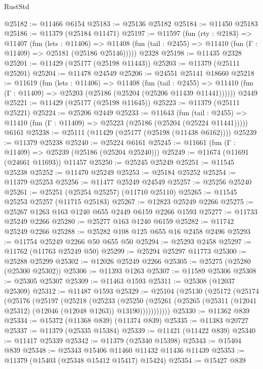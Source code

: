 \begin{lexlean}{RustStd}
\begin{coremodule}
@25182 := @11466 @6154
@25183 := @25136 @25182
@25184 := @11450 @25183
@25186 := @11379 (@25184 @11471)
@25197 := @11597
    (fun (rty : @2183) =>
    @11407
      (fun (lets : @11406) =>
      @11408 (fun (tail : @2455) => @11410 (fun (Γ : @11409) => @25181 (@25186 @25146)))))
    @2328
@25198 := @11435 @2328
@25201 := @11429 (@25177 (@25198 @11443))
@25203 := @11379 (@25111 @25201)
@25204 := @11478 @24549
@25206 := @24551 @25141 @18660
@25218 := @11619
    (fun (lets : @11406) =>
    @11408
      (fun (tail : @2455) =>
      @11410 (fun (Γ : @11409) => @25203 (@25186 (@25204 (@25206 @11439 @11441))))))
    @2449
@25221 := @11429 (@25177 (@25198 @11645))
@25223 := @11379 (@25111 @25221)
@25224 := @25206 @2449
@25233 := @11643
    (fun (tail : @2455) => @11410 (fun (Γ : @11409) => @25223 (@25186 (@25204 (@25224 @11441)))))
    @6161
@25238 := @25111 (@11429 (@25177 (@25198 (@11438 @6162))))
@25239 := @11379 @25238
@25240 := @25224 @6161
@25245 := @11661 (fun (Γ : @11409) => @25239 (@25186 (@25204 @25240)))
@25249 := @11674 (@11691 (@24661 @11693)) @11457
@25250 := @25245 @25249
@25251 := @11545 @25238
@25252 := @11470 @25249
@25253 := @25184 @25252
@25254 := @11379 @25253
@25256 := @11477 @25249 @24549
@25257 := @25256 @25240
@25261 := @25251 (@25254 @25257) (@11710 @25110)
@25265 := @11545 @25253 @25257 (@11715 @25183)
@25267 := @12823 @25249 @2266
@25275 := @25267 @1263 @163 @1240 @655 @2449 @6159 @2266 @1593
@25277 := @11733 @25249 @2266
@25280 := @25277 @163 @1240 @6159
@25282 := @11742 @25249 @2266
@25288 := @25282 @108 @125 @655 @16 @2458 @2496
@25293 := @11754 @25249 @2266 @50 @655 @50
@25294 := @25293 @2458
@25297 := @11762 (@11763 @25249 @50)
@25299 := @25294 @25297 @11773
@25300 := @25288 @25299
@25302 := @12026 @25249 @2266
@25305 := @25275 (@25280 (@25300 @25302))
@25306 := @11393 @1263
@25307 := @11589 @25306
@25308 := @25305 @25307
@25309 := @11463 @1593
@25311 := @25308 (@12037 @25309)
@25312 := @11487 @1593
@25329 := @25104
    (@25130
      (@25172
        (@25174
          (@25176
            (@25197
              (@25218
                (@25233
                  (@25250
                    (@25261
                      (@25265 (@25311 (@12041 @25312) (@12046 (@12048 @1263)) @13190)))))))))))
@25330 := @11362 @839
@25334 := @15372 (@11368 @839) (@11374 @839)
@25335 := @11383 @20727
@25337 := @11379 (@25335 @15384)
@25339 := @11421 (@11422 @839)
@25340 := @11417 @25339
@25342 := @11379 (@25340 @15398)
@25343 := @15404 @839
@25348 := @25343 @15406 @11460 @11432 @11436 @11439
@25353 := @11379 (@15403 (@25348 @15412 @15417) @15424)
@25354 := @15427 @839

\end{coremodule}
\end{lexlean}
